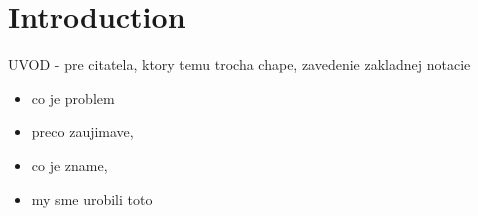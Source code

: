 







\section*{Introduction}


UVOD - pre citatela, ktory temu trocha chape, zavedenie zakladnej notacie 
\begin{itemize} 
\item   co je problem
\item   preco zaujimave,
\item   co je zname,
\item   my sme urobili toto
\end{itemize} 

